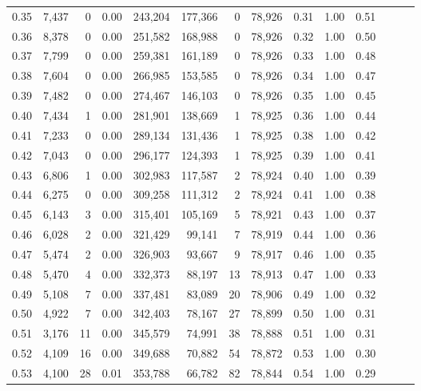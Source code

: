 \begin{tabular}{rrrrrrrrrrrrrr}
0.35 &  7,437 &      0 &  0.00 &  243,204 &  177,366 &       0 &  78,926 &  0.31 &  1.00 &      0.51 \\
0.36 &  8,378 &      0 &  0.00 &  251,582 &  168,988 &       0 &  78,926 &  0.32 &  1.00 &      0.50 \\
0.37 &  7,799 &      0 &  0.00 &  259,381 &  161,189 &       0 &  78,926 &  0.33 &  1.00 &      0.48 \\
0.38 &  7,604 &      0 &  0.00 &  266,985 &  153,585 &       0 &  78,926 &  0.34 &  1.00 &      0.47 \\
0.39 &  7,482 &      0 &  0.00 &  274,467 &  146,103 &       0 &  78,926 &  0.35 &  1.00 &      0.45 \\
0.40 &  7,434 &      1 &  0.00 &  281,901 &  138,669 &       1 &  78,925 &  0.36 &  1.00 &      0.44 \\
0.41 &  7,233 &      0 &  0.00 &  289,134 &  131,436 &       1 &  78,925 &  0.38 &  1.00 &      0.42 \\
0.42 &  7,043 &      0 &  0.00 &  296,177 &  124,393 &       1 &  78,925 &  0.39 &  1.00 &      0.41 \\
0.43 &  6,806 &      1 &  0.00 &  302,983 &  117,587 &       2 &  78,924 &  0.40 &  1.00 &      0.39 \\
0.44 &  6,275 &      0 &  0.00 &  309,258 &  111,312 &       2 &  78,924 &  0.41 &  1.00 &      0.38 \\
0.45 &  6,143 &      3 &  0.00 &  315,401 &  105,169 &       5 &  78,921 &  0.43 &  1.00 &      0.37 \\
0.46 &  6,028 &      2 &  0.00 &  321,429 &   99,141 &       7 &  78,919 &  0.44 &  1.00 &      0.36 \\
0.47 &  5,474 &      2 &  0.00 &  326,903 &   93,667 &       9 &  78,917 &  0.46 &  1.00 &      0.35 \\
0.48 &  5,470 &      4 &  0.00 &  332,373 &   88,197 &      13 &  78,913 &  0.47 &  1.00 &      0.33 \\
0.49 &  5,108 &      7 &  0.00 &  337,481 &   83,089 &      20 &  78,906 &  0.49 &  1.00 &      0.32 \\
0.50 &  4,922 &      7 &  0.00 &  342,403 &   78,167 &      27 &  78,899 &  0.50 &  1.00 &      0.31 \\
0.51 &  3,176 &     11 &  0.00 &  345,579 &   74,991 &      38 &  78,888 &  0.51 &  1.00 &      0.31 \\
0.52 &  4,109 &     16 &  0.00 &  349,688 &   70,882 &      54 &  78,872 &  0.53 &  1.00 &      0.30 \\
0.53 &  4,100 &     28 &  0.01 &  353,788 &   66,782 &      82 &  78,844 &  0.54 &  1.00 &      0.29 \\

\end{tabular}

